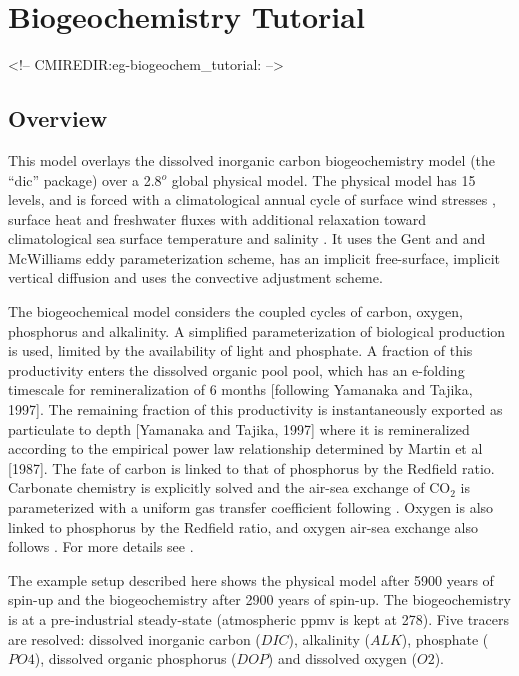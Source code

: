 \section{Biogeochemistry Tutorial}
\label{www:tutorials}
\label{sect:eg-biogeochem_tutorial}
\begin{rawhtml}
<!-- CMIREDIR:eg-biogeochem_tutorial: -->
\end{rawhtml}

\subsection{Overview}
This model overlays the dissolved inorganic carbon biogeochemistry
model (the ``dic'' package) over a 2.8$^o$ global physical model. The
physical model has 15 levels, and is forced with a climatological
annual cycle of surface wind stresses \cite{Trenberth_etal_89},
surface heat and freshwater fluxes  with additional
relaxation toward climatological sea surface temperature and salinity
\cite{lev:94a,Levitus94}.  It uses the Gent and and McWilliams
\cite{gen-mcw:90} eddy parameterization scheme, has an implicit
free-surface, implicit vertical diffusion and uses the convective
adjustment scheme.

The biogeochemical model considers the coupled cycles of carbon,
oxygen, phosphorus and alkalinity.  A simplified parameterization of
biological production is used, limited by the availability of light
and phosphate.  A fraction of this productivity enters the dissolved
organic pool pool, which has an e-folding timescale for
remineralization of 6 months [following Yamanaka and Tajika, 1997].
The remaining fraction of this productivity is instantaneously
exported as particulate to depth [Yamanaka and Tajika, 1997] where it
is remineralized according to the empirical power law relationship
determined by Martin et al [1987].  The fate of carbon is linked to
that of phosphorus by the Redfield ratio. Carbonate chemistry is
explicitly solved \cite{Follows_etal_05} and the air-sea exchange of
CO$_2$ is parameterized with a uniform gas transfer coefficient
following \cite{Wanninkhof_92}. Oxygen is also linked to phosphorus by
the Redfield ratio, and oxygen air-sea exchange also follows
\cite{Wanninkhof_92}.  For more details see \cite{Dutkiewicz_etal_05}.

The example setup described here shows the physical model after 5900
years of spin-up and the biogeochemistry after 2900 years of spin-up.
The biogeochemistry is at a pre-industrial steady-state (atmospheric
ppmv is kept at 278). Five tracers are resolved: dissolved inorganic
carbon ($DIC$), alkalinity ($ALK$), phosphate ($PO4$), dissolved
organic phosphorus ($DOP$) and dissolved oxygen ($O2$).


